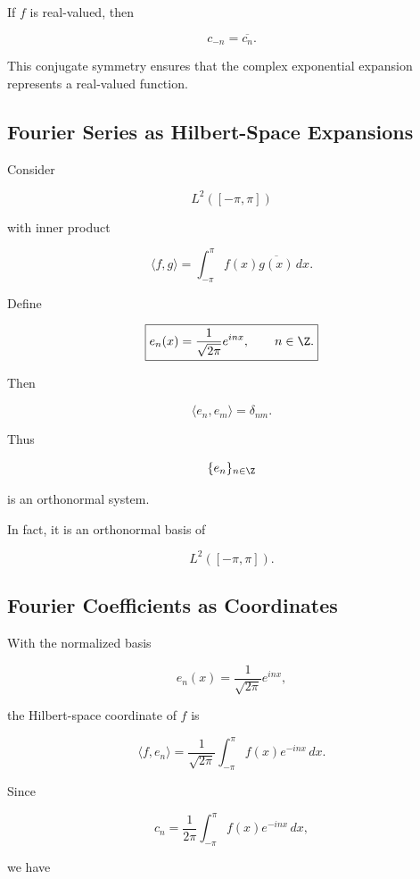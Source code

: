If \(f\) is real-valued, then

\[
\boxed{
c_{-n}
=
\overline{c_n}.
}
\]

This conjugate symmetry ensures that the complex exponential expansion
represents a real-valued function.

\subsection{Fourier Series as Hilbert-Space Expansions}
\label{subsec:fourier-hilbert-expansion}

Consider

\[
L^2([-\pi,\pi])
\]

with inner product

\[
\boxed{
\langle f,g\rangle
=
\int_{-\pi}^{\pi}
f(x)\overline{g(x)}\,dx.
}
\]

Define

\[
\boxed{
e_n(x)
=
\frac{1}{\sqrt{2\pi}}e^{inx},
\qquad
n\in\Z.
}
\]

Then

\[
\boxed{
\langle e_n,e_m\rangle
=
\delta_{nm}.
}
\]

Thus

\[
\{e_n\}_{n\in\Z}
\]

is an orthonormal system.

In fact, it is an orthonormal basis of

\[
L^2([-\pi,\pi]).
\]

\subsection{Fourier Coefficients as Coordinates}
\label{subsec:fourier-coordinates}

With the normalized basis

\[
e_n(x)
=
\frac{1}{\sqrt{2\pi}}e^{inx},
\]

the Hilbert-space coordinate of \(f\) is

\[
\langle f,e_n\rangle
=
\frac{1}{\sqrt{2\pi}}
\int_{-\pi}^{\pi}
f(x)e^{-inx}\,dx.
\]

Since

\[
c_n
=
\frac{1}{2\pi}
\int_{-\pi}^{\pi}
f(x)e^{-inx}\,dx,
\]

we have

